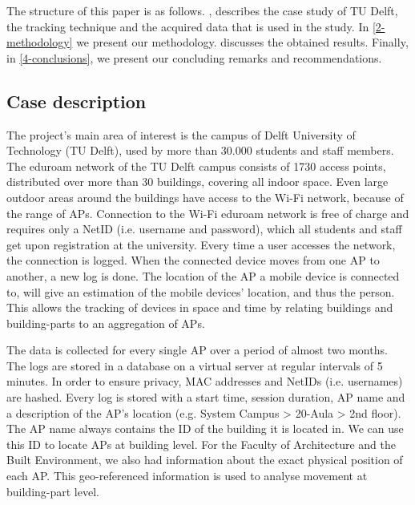 The structure of this paper is as follows. , describes the case study of TU Delft, the tracking technique and the acquired data that is used in the study. In \autoref{2-methodology} we present our methodology.  discusses the obtained results. Finally, in \autoref{4-conclusions}, we present our concluding remarks and recommendations. 

\subsection{Case description}\label{ES-caseDescription}
The project’s main area of interest is the campus of Delft University of Technology (TU Delft), used by more than 30.000 students and staff members. The eduroam network of the TU Delft campus consists of 1730 access points, distributed over more than 30 buildings, covering all indoor space. Even large outdoor areas around the buildings have access to the Wi-Fi network, because of the range of APs. Connection to the Wi-Fi eduroam network is free of charge and requires only a NetID (i.e. username and password), which all students and staff get upon registration at the university. Every time a user accesses the network, the connection is logged. When the connected device moves from one AP to another, a new log is done. The location of the AP a mobile device is connected to, will give an estimation of the mobile devices’ location, and thus the person. This allows the tracking of devices in space and time by relating buildings and building-parts to an aggregation of APs.

The data is collected for every single AP over a period of almost two months. The logs are stored in a database on a virtual server at regular intervals of 5 minutes. In order to ensure privacy, MAC addresses and NetIDs (i.e. usernames) are hashed. Every log is stored with a start time, session duration, AP name and a description of the AP’s location (e.g. System Campus > 20-Aula > 2nd floor). The AP name always contains the ID of the building it is located in. We can use this ID to locate APs at building level. For the Faculty of Architecture and the Built Environment, we also had information about the exact physical position of each AP. This geo-referenced information is used to analyse movement at building-part level.